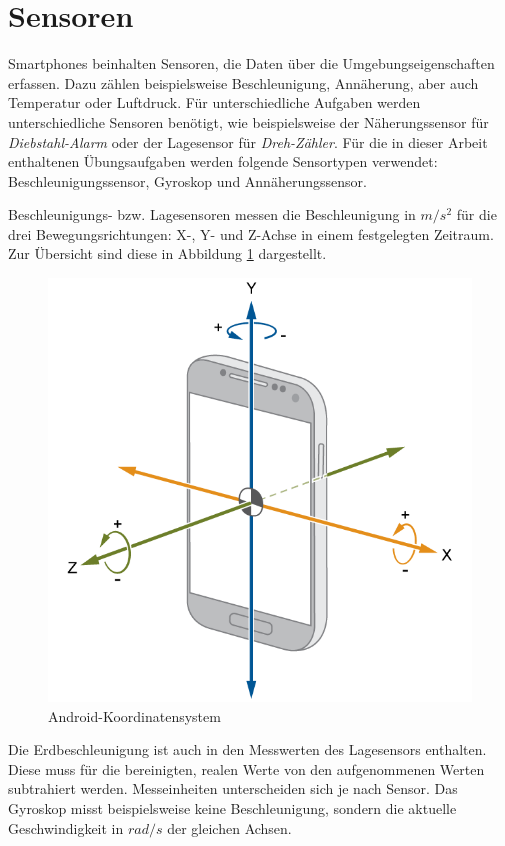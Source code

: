 \documentclass[11pt,a4paper]{report}
\begin{document}
\section{Sensoren}
Smartphones beinhalten Sensoren, die Daten über die Umgebungseigenschaften erfassen.
Dazu zählen beispielsweise Beschleunigung, Annäherung, aber auch Temperatur oder Luftdruck.
Für unterschiedliche Aufgaben werden unterschiedliche Sensoren benötigt, wie beispielsweise der Näherungssensor für \textit{Diebstahl-Alarm} oder der Lagesensor für \textit{Dreh-Zähler}.
Für die in dieser Arbeit enthaltenen Übungsaufgaben werden folgende Sensortypen verwendet: Beschleunigungssensor, Gyroskop und Annäherungssensor.

Beschleunigungs- bzw. Lagesensoren messen die Beschleunigung in $m/s^2$ für die drei Bewegungsrichtungen: X-, Y- und Z-Achse in einem festgelegten Zeitraum.
Zur Übersicht sind diese in Abbildung \ref{fig:and_axes} dargestellt.
\begin{figure}[htbp]
  \centering
  \includegraphics[width=.7\textwidth]{images/android_axes.png}
  \caption{Android-Koordinatensystem}
  \label{fig:and_axes}
\end{figure}
Die Erdbeschleunigung ist auch in den Messwerten des Lagesensors enthalten.
Diese muss für die bereinigten, realen Werte von den aufgenommenen Werten subtrahiert werden\cite{accel_g}.
Messeinheiten unterscheiden sich je nach Sensor.
Das Gyroskop misst beispielsweise keine Beschleunigung, sondern die aktuelle Geschwindigkeit in $rad/s$ der gleichen Achsen.
\end{document}
